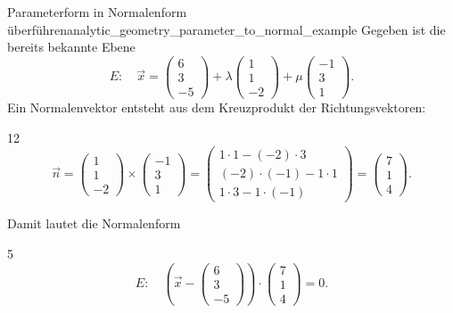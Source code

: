 \begin{ExampleBox}{Parameterform in Normalenform überführen}{analytic_geometry_parameter_to_normal_example}
    Gegeben ist die bereits bekannte Ebene
    \[
      E:\quad
      \vec x=\begin{pmatrix}6\\3\\-5\end{pmatrix}
        +\lambda\begin{pmatrix}1\\1\\-2\end{pmatrix}
        +\mu\begin{pmatrix}-1\\3\\1\end{pmatrix}.
    \]
    Ein Normalenvektor entsteht aus dem Kreuzprodukt der Richtungsvektoren:
    \begin{ClozeArea}[34]{12}
      \[
        \vec n
        =\begin{pmatrix}1\\1\\-2\end{pmatrix}
          \times\begin{pmatrix}-1\\3\\1\end{pmatrix}
        =\begin{pmatrix}
            1\cdot1-(-2)\cdot3\\
            (-2)\cdot(-1)-1\cdot1\\
            1\cdot3-1\cdot(-1)
          \end{pmatrix}
        =\begin{pmatrix}7\\1\\4\end{pmatrix}.
      \]
    \end{ClozeArea}
    Damit lautet die Normalenform
    \begin{ClozeArea}[34]{5}
      \[
        E:\quad
        \left(\vec x-\begin{pmatrix}6\\3\\-5\end{pmatrix}\right)
          \cdot\begin{pmatrix}7\\1\\4\end{pmatrix}=0.
      \]
    \end{ClozeArea}
\end{ExampleBox}

